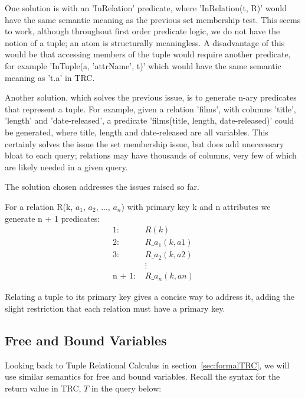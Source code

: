 \documentclass[a4paper, 11pt]{article}
\begin{document}
      One solution is with an 'InRelation' predicate, where 'InRelation(t, R)'
      would have the same semantic meaning as the previous set membership test.
      This seems to work, although throughout first order predicate logic, we
      do not have the notion of a tuple; an atom is structurally meaningless. A
      disadvantage of this would be that accessing members of the tuple would
      require another predicate, for example 'InTuple(a, 'attrName', t)' which
      would have the same semantic meaning as 't.a' in TRC.

      Another solution, which solves the previous issue, is to generate n-ary
      predicates that represent a tuple. For example, given a relation 'films',
      with columns 'title', 'length' and 'date-released', a predicate
      'films(title, length, date-released)' could be generated, where title,
      length and date-released are all variables. This certainly solves the
      issue the set membership issue, but does add uneccessary bloat to each
      query; relations may have thousands of columns, very few of which are
      likely needed in a given query.

      The solution chosen addresses the issues raised so far.

      For a relation R(k, $a_{1}$, $a_{2}$, ..., $a_{n}$) with primary key k
      and n attributes we generate n + 1 predicates:
      \begin{align*}
        \text{1:  }     & R(k)            \\
        \text{2:  }     & R\_a_1(k, a1)   \\
        \text{3:  }     & R\_a_2(k, a2)   \\
                        & \vdots          \\
        \text{n + 1:  }  & R\_a_n(k, an)
      \end{align*}

      Relating a tuple to its primary key gives a concise way to address it,
      adding the slight restriction that each relation must have a primary key.

    \subsection{Free and Bound Variables}

      Looking back to Tuple Relational Calculus in
      section~\ref{sec:formalTRC}, we will use similar semantics for free and
      bound variables. Recall the syntax for the return value in TRC, $T$ in the
      query below:
\end{document}
